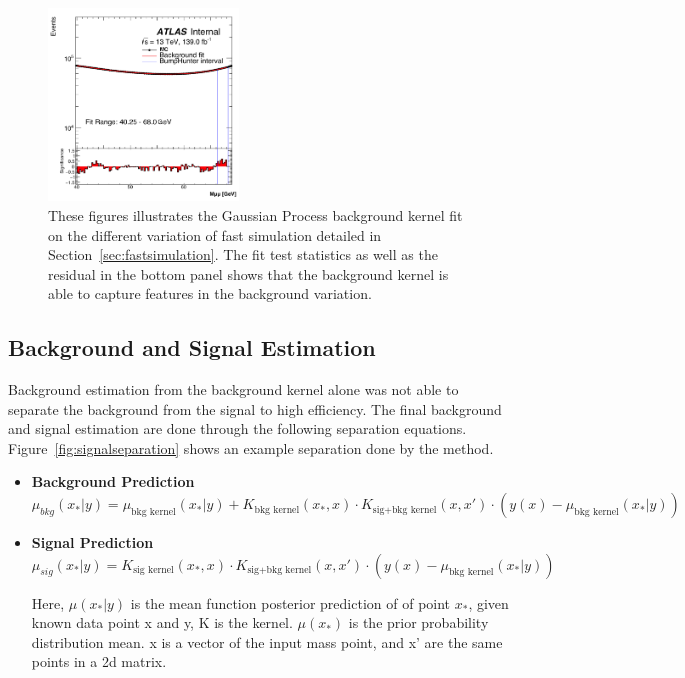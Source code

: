 \begin{figure}[!htb]
\begin{center}
        \includegraphics[width=0.45\textwidth]{figures/chapter_dimuon/eta}        
        \caption{
        These figures illustrates the Gaussian Process background kernel fit on the different variation of fast simulation detailed in Section~\ref{sec:fastsimulation}. The fit test statistics as well as the residual in the bottom panel shows that the background kernel is able to capture features in the background variation. 
        }
        \label{fig:dimuonmass}
    \end{center}
\end{figure}
\FloatBarrier

\subsection{Background and Signal Estimation}
Background estimation from the background kernel alone was not able to separate the background from the signal to high efficiency. The final background and signal estimation are done through the following separation equations. Figure~\ref{fig:signalseparation} shows an example separation done by the method.

\begin{itemize}
    \item \textbf{Background Prediction}
    \begin{equation}
        \mu_{bkg}(x_{*}|y) = \mu_{\textrm{bkg kernel}}(x_{*}|y)+K_{\textrm{bkg kernel}}(x_{*}, x) \cdot K_{\textrm{sig+bkg kernel}}(x,x') \cdot( y(x)-\mu_{\textrm{bkg kernel}}(x_{*}|y) )
    \end{equation}


    \item \textbf{Signal Prediction}
    \begin{equation}
        \mu_{sig}(x_{*}|y) = K_{\textrm{sig kernel}}(x_{*}, x)\cdot K_{\textrm{sig+bkg kernel}}(x,x') \cdot ( y(x)-\mu_{\textrm{bkg kernel}}(x_{*}|y) )
    \end{equation}

    Here, $\mu(x_{*}| y) $ is the mean function posterior prediction of of point $x_{*}$, given known data point x and y, K is the kernel. $\mu(x_{*})$ is the prior probability distribution mean. x is a vector of the input mass point, and x' are the same points in a 2d matrix.

\end{itemize}


